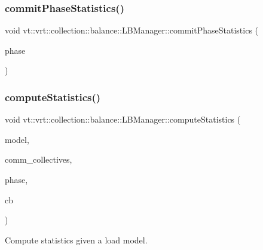 \subsubsection{\texorpdfstring{commit\+Phase\+Statistics()}{commitPhaseStatistics()}}
{\footnotesize\ttfamily void vt\+::vrt\+::collection\+::balance\+::\+L\+B\+Manager\+::commit\+Phase\+Statistics (\begin{DoxyParamCaption}\item[{\hyperlink{namespacevt_a46ce6733d5cdbd735d561b7b4029f6d7}{Phase\+Type}}]{phase }\end{DoxyParamCaption})}

\mbox{\label{structvt_1_1vrt_1_1collection_1_1balance_1_1_l_b_manager_a7a917039501f03791938d2a7a5c5c7db}} 
\subsubsection{\texorpdfstring{compute\+Statistics()}{computeStatistics()}}
{\footnotesize\ttfamily void vt\+::vrt\+::collection\+::balance\+::\+L\+B\+Manager\+::compute\+Statistics (\begin{DoxyParamCaption}\item[{std\+::shared\+\_\+ptr$<$ \hyperlink{structvt_1_1vrt_1_1collection_1_1balance_1_1_load_model}{Load\+Model} $>$}]{model,  }\item[{bool}]{comm\+\_\+collectives,  }\item[{\hyperlink{namespacevt_a46ce6733d5cdbd735d561b7b4029f6d7}{Phase\+Type}}]{phase,  }\item[{\hyperlink{namespacevt_a57b238783d05de96bc2c4027f7073b7f}{vt\+::\+Callback}$<$ std\+::vector$<$ \hyperlink{structvt_1_1vrt_1_1collection_1_1balance_1_1_load_data}{balance\+::\+Load\+Data} $>$$>$}]{cb }\end{DoxyParamCaption})}



Compute statistics given a load model. 


